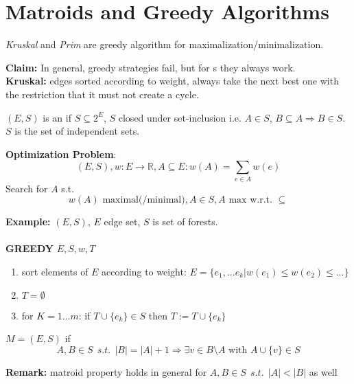 
\section{Matroids and Greedy Algorithms}

\textit{Kruskal} and \textit{Prim} are greedy algorithm for maximalization/minimalization. 

\textbf{Claim:} In general, greedy strategies fail, but for s they always work.\\

\textbf{Kruskal:} edges sorted according to weight, always take the next best one with the restriction that it must not create a cycle.

\begin{definition}
$(E, S)$ is an  if $S \subseteq 2^E$, $S$ closed under set-inclusion i.e. $A\in S$, $B \subseteq A \Rightarrow B\in S$.\\
$S$ is the set of independent sets.
\end{definition}

\textbf{Optimization Problem}:
\[ (E, S), w: E \rightarrow \mathbb{R}, A\subseteq E: w(A) = \sum_{e\in A} w(e)\]
Search for $A$ s.t.
\[ w(A) \text{ maximal(/minimal)}, A\in S, A \text{ max w.r.t. } \subseteq\]

\textbf{Example:} $(E, S)$, $E$ edge set, $S$ is set of forests.\\\\
\textbf{GREEDY} $E, S, w, T$
\begin{enumerate}
	\item{sort elements of $E$ according to weight: $E=\{e_1, ... e_k|w(e_1)\le w(e_2)\le...\}$}
	\item{$T=\emptyset$}
	\item{for $K=1...m$: if $T\cup\{e_k\} \in S $ then $T:= T\cup\{e_k\}$}
\end{enumerate}

\begin{definition}
	$M=(E, S)$   if
	\[
	A, B \in S~~s.t.~~|B|=|A|+1\Rightarrow\exists v\in B\setminus A \text{ with } A\cup\{v\}\in S
	\]
\end{definition}

\textbf{Remark:} matroid property holds in general for $A,B \in S~~s.t.~~|A|<|B|$ as well\\

